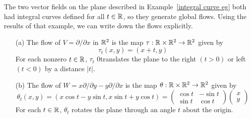 \begin{example}\label{flow eg}
The two vector fields on the plane described in Example~\ref{integral curve eg} both had integral curves defined for all $t\in\mathbb{R}$, so they generate global
flows. Using the results of that example, we can write down the flows explicitly.
\begin{itemize}
\item[(a)] The flow of $V=\partial/\partial x$ in $\mathbb{R}^2$ is the map $\tau:\mathbb{R}\times\mathbb{R}^2\to\mathbb{R}^2$ given by
\[\tau_t(x,y)=(x+t,y)\]
For each nonzero $t\in\mathbb{R}$, $\tau_t$ 0translates the plane to the right $(t>0)$ or left $(t<0)$ by a distance $|t|$.
\item[(b)] The flow of $W=x\partial/\partial y-y\partial/\partial x$ is the map $\theta:\mathbb{R}\times\mathbb{R}^2\to\mathbb{R}^2$ given by
\[\theta_t(x,y)=(x\cos t-y\sin t,x\sin t+y\cos t)=\begin{pmatrix}
\cos t&-\sin t\\
\sin t&\cos t
\end{pmatrix}\begin{pmatrix}
x\\
y
\end{pmatrix}\]
For each $t\in\mathbb{R}$, $\theta_t$ rotates the plane through an angle $t$ about the origin.
\end{itemize}
\end{example}
